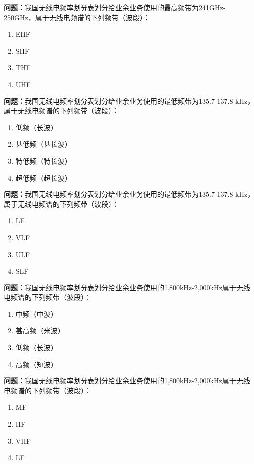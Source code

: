 \bigskip


\noindent\textbf{问题：}我国无线电频率划分表划分给业余业务使用的最高频带为241GHz-250GHz，属于无线电频谱的下列频带（波段）：
\begin{enumerate}[label=\Alph*), leftmargin=3em]
\item EHF
\item SHF
\item THF
\item UHF
\end{enumerate}

\bigskip


\noindent\textbf{问题：}我国无线电频率划分表划分给业余业务使用的最低频带为135.7-137.8 kHz，属于无线电频谱的下列频带（波段）：
\begin{enumerate}[label=\Alph*), leftmargin=3em]
\item 低频（长波）
\item 甚低频（甚长波）
\item 特低频（特长波）
\item 超低频（超长波）
\end{enumerate}

\bigskip


\noindent\textbf{问题：}我国无线电频率划分表划分给业余业务使用的最低频带为135.7-137.8 kHz，属于无线电频谱的下列频带（波段）：
\begin{enumerate}[label=\Alph*), leftmargin=3em]
\item LF
\item VLF
\item ULF
\item SLF
\end{enumerate}

\bigskip


\noindent\textbf{问题：}我国无线电频率划分表划分给业余业务使用的1,800kHz-2,000kHz属于无线电频谱的下列频带（波段）：
\begin{enumerate}[label=\Alph*), leftmargin=3em]
\item 中频（中波）
\item 甚高频（米波）
\item 低频（长波）
\item 高频（短波）
\end{enumerate}

\bigskip


\noindent\textbf{问题：}我国无线电频率划分表划分给业余业务使用的1,800kHz-2,000kHz属于无线电频谱的下列频带（波段）：
\begin{enumerate}[label=\Alph*), leftmargin=3em]
\item MF
\item HF
\item VHF
\item LF
\end{enumerate}

